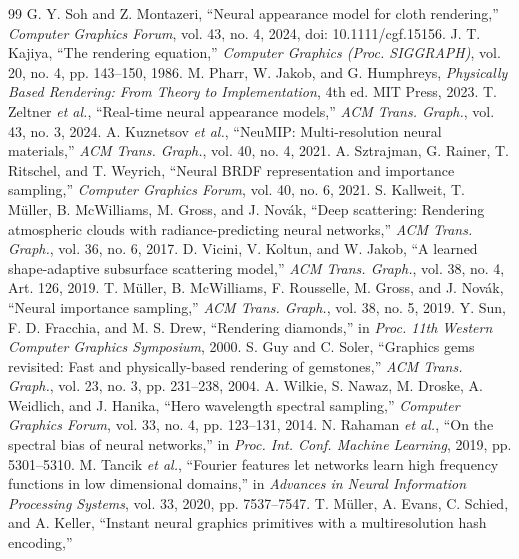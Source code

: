 \documentclass[conference]{IEEEtran}
\begin{document}
\begin{thebibliography}{99}
 G. Y. Soh and Z. Montazeri, ``Neural appearance model for cloth
rendering,'' \emph{Computer Graphics Forum}, vol. 43, no. 4, 2024,
doi: 10.1111/cgf.15156.
 J. T. Kajiya, ``The rendering equation,'' \emph{Computer
Graphics (Proc. SIGGRAPH)}, vol. 20, no. 4, pp. 143--150, 1986.
 M. Pharr, W. Jakob, and G. Humphreys,
\emph{Physically Based Rendering: From Theory to Implementation}, 4th ed.
MIT Press, 2023.
 T. Zeltner \emph{et al.}, ``Real-time neural appearance
models,'' \emph{ACM Trans. Graph.}, vol. 43, no. 3, 2024.
 A. Kuznetsov \emph{et al.}, ``NeuMIP: Multi-resolution
neural materials,'' \emph{ACM Trans. Graph.}, vol. 40, no. 4, 2021.
 A. Sztrajman, G. Rainer, T. Ritschel, and T. Weyrich,
``Neural BRDF representation and importance sampling,'' \emph{Computer Graphics
Forum}, vol. 40, no. 6, 2021.
 S. Kallweit, T. M\"uller, B. McWilliams, M. Gross, and
J. Nov\'ak, ``Deep scattering: Rendering atmospheric clouds with
radiance-predicting neural networks,'' \emph{ACM Trans. Graph.}, vol. 36, no. 6,
2017.
 D. Vicini, V. Koltun, and W. Jakob, ``A learned shape-adaptive
subsurface scattering model,'' \emph{ACM Trans. Graph.}, vol. 38, no. 4,
Art. 126, 2019.
 T. M\"uller, B. McWilliams, F. Rousselle, M. Gross, and
J. Nov\'ak, ``Neural importance sampling,'' \emph{ACM Trans. Graph.}, vol. 38,
no. 5, 2019.
 Y. Sun, F. D. Fracchia, and M. S. Drew, ``Rendering diamonds,''
in \emph{Proc. 11th Western Computer Graphics Symposium}, 2000.
 S. Guy and C. Soler, ``Graphics gems revisited: Fast and
physically-based rendering of gemstones,'' \emph{ACM Trans. Graph.}, vol. 23,
no. 3, pp. 231--238, 2004.
 A. Wilkie, S. Nawaz, M. Droske, A. Weidlich, and J. Hanika,
``Hero wavelength spectral sampling,'' \emph{Computer Graphics Forum}, vol. 33,
no. 4, pp. 123--131, 2014.
 N. Rahaman \emph{et al.}, ``On the spectral bias of neural
networks,'' in \emph{Proc. Int. Conf. Machine Learning}, 2019, pp. 5301--5310.
 M. Tancik \emph{et al.}, ``Fourier features let networks learn
high frequency functions in low dimensional domains,'' in \emph{Advances in
Neural Information Processing Systems}, vol. 33, 2020, pp. 7537--7547.
 T. M\"uller, A. Evans, C. Schied, and A. Keller,
``Instant neural graphics primitives with a multiresolution hash encoding,''

\end{thebibliography}
\end{document}
